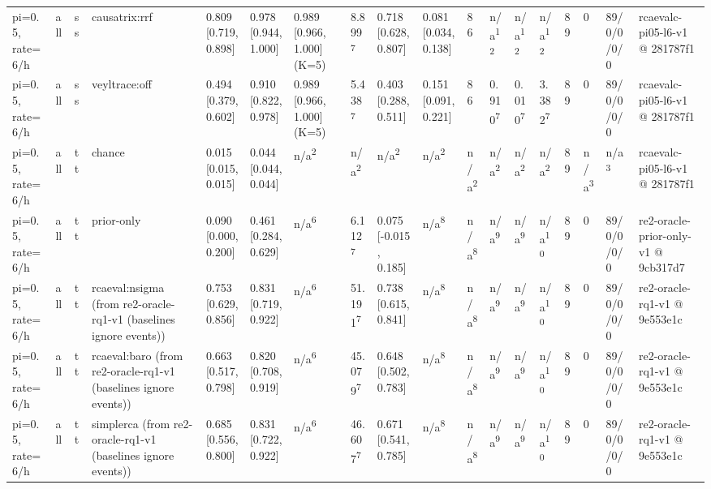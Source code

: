 \begin{table}[t]
\begin{tabular}{llllllllllllllllll}
pi=0.5, rate=6/h & all & ss & causatrix:rrf & 0.809 [0.719, 0.898] & 0.978 [0.944, 1.000] & 0.989 [0.966, 1.000] (K=5) & 8.899\textsuperscript{7} & 0.718 [0.628, 0.807] & 0.081 [0.034, 0.138] & 86 & n/a\textsuperscript{12} & n/a\textsuperscript{12} & n/a\textsuperscript{12} & 89 & 0 & 89/0/0/0/0 & rcaevalc-pi05-l6-v1 @ 281787f1 \\
pi=0.5, rate=6/h & all & ss & veyltrace:off & 0.494 [0.379, 0.602] & 0.910 [0.822, 0.978] & 0.989 [0.966, 1.000] (K=5) & 5.438\textsuperscript{7} & 0.403 [0.288, 0.511] & 0.151 [0.091, 0.221] & 86 & 0.910\textsuperscript{7} & 0.010\textsuperscript{7} & 3.382\textsuperscript{7} & 89 & 0 & 89/0/0/0/0 & rcaevalc-pi05-l6-v1 @ 281787f1 \\
pi=0.5, rate=6/h & all & tt & chance & 0.015 [0.015, 0.015] & 0.044 [0.044, 0.044] & n/a\textsuperscript{2} & n/a\textsuperscript{2} & n/a\textsuperscript{2} & n/a\textsuperscript{2} & n/a\textsuperscript{2} & n/a\textsuperscript{2} & n/a\textsuperscript{2} & n/a\textsuperscript{2} & 89 & n/a\textsuperscript{3} & n/a\textsuperscript{3} & rcaevalc-pi05-l6-v1 @ 281787f1 \\
pi=0.5, rate=6/h & all & tt & prior-only & 0.090 [0.000, 0.200] & 0.461 [0.284, 0.629] & n/a\textsuperscript{6} & 6.112\textsuperscript{7} & 0.075 [-0.015, 0.185] & n/a\textsuperscript{8} & n/a\textsuperscript{8} & n/a\textsuperscript{9} & n/a\textsuperscript{9} & n/a\textsuperscript{10} & 89 & 0 & 89/0/0/0/0 & re2-oracle-prior-only-v1 @ 9cb317d7 \\
pi=0.5, rate=6/h & all & tt & rcaeval:nsigma (from re2-oracle-rq1-v1 (baselines ignore events)) & 0.753 [0.629, 0.856] & 0.831 [0.719, 0.922] & n/a\textsuperscript{6} & 51.191\textsuperscript{7} & 0.738 [0.615, 0.841] & n/a\textsuperscript{8} & n/a\textsuperscript{8} & n/a\textsuperscript{9} & n/a\textsuperscript{9} & n/a\textsuperscript{10} & 89 & 0 & 89/0/0/0/0 & re2-oracle-rq1-v1 @ 9e553e1c \\
pi=0.5, rate=6/h & all & tt & rcaeval:baro (from re2-oracle-rq1-v1 (baselines ignore events)) & 0.663 [0.517, 0.798] & 0.820 [0.708, 0.919] & n/a\textsuperscript{6} & 45.079\textsuperscript{7} & 0.648 [0.502, 0.783] & n/a\textsuperscript{8} & n/a\textsuperscript{8} & n/a\textsuperscript{9} & n/a\textsuperscript{9} & n/a\textsuperscript{10} & 89 & 0 & 89/0/0/0/0 & re2-oracle-rq1-v1 @ 9e553e1c \\
pi=0.5, rate=6/h & all & tt & simplerca (from re2-oracle-rq1-v1 (baselines ignore events)) & 0.685 [0.556, 0.800] & 0.831 [0.722, 0.922] & n/a\textsuperscript{6} & 46.607\textsuperscript{7} & 0.671 [0.541, 0.785] & n/a\textsuperscript{8} & n/a\textsuperscript{8} & n/a\textsuperscript{9} & n/a\textsuperscript{9} & n/a\textsuperscript{10} & 89 & 0 & 89/0/0/0/0 & re2-oracle-rq1-v1 @ 9e553e1c \\

\end{tabular}
\end{table}
